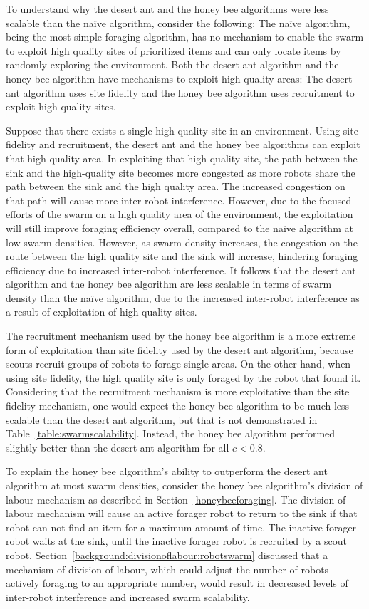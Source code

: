 To understand why the desert ant and the honey bee algorithms were less scalable than the na\"ive algorithm, consider the following: The na\"ive algorithm, being the most simple foraging algorithm, has no mechanism to enable the swarm to exploit high quality sites of prioritized items and can only locate items by randomly exploring the environment. Both the desert ant algorithm and the honey bee algorithm have mechanisms to exploit high quality areas: The desert ant algorithm uses site fidelity and the honey bee algorithm uses recruitment to exploit high quality sites. 

Suppose that there exists a single high quality site in an environment. Using site-fidelity and recruitment, the desert ant and the honey bee algorithms can exploit that high quality area. In exploiting that high quality site, the path between the sink and the high-quality site becomes more congested as more robots share the path between the sink and the high quality area. The increased congestion on that path will cause more inter-robot interference. However, due to the focused efforts of the swarm on a high quality area of the environment, the exploitation will still improve foraging efficiency overall, compared to the na\"ive algorithm at low swarm densities. However, as swarm density increases, the congestion on the route between the high quality site and the sink will increase, hindering foraging efficiency due to increased inter-robot interference. It follows that the desert ant algorithm and the honey bee algorithm are less scalable in terms of swarm density than the na\"ive algorithm, due to the increased inter-robot interference as a result of exploitation of high quality sites.

The recruitment mechanism used by the honey bee algorithm is a more extreme form of exploitation than site fidelity used by the desert ant algorithm, because scouts recruit groups of robots to forage single areas. On the other hand, when using site fidelity, the high quality site is only foraged by the robot that found it. Considering that the recruitment mechanism is more exploitative than the site fidelity mechanism, one would expect the honey bee algorithm to be much less scalable than the desert ant algorithm, but that is not demonstrated in Table~\ref{table:swarmscalability}. Instead, the honey bee algorithm performed slightly better than the desert ant algorithm for all $c < 0.8$.

To explain the honey bee algorithm's ability to outperform the desert ant algorithm at most swarm densities, consider the honey bee algorithm's division of labour mechanism as described in Section~\ref{honeybeeforaging}. The division of labour mechanism will cause an active forager robot to return to the sink if that robot can not find an item for a maximum amount of time. The inactive forager robot waits at the sink, until the inactive forager robot is recruited by a scout robot. Section~\ref{background:divisionoflabour:robotswarm} discussed that a mechanism of division of labour, which could adjust the number of robots actively foraging to an appropriate number, would result in decreased levels of inter-robot interference and increased swarm scalability.

